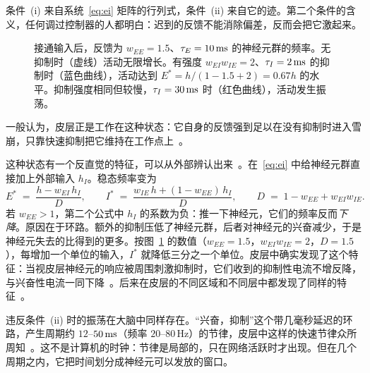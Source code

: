 条件~(i) 来自系统~\eqref{eq:ei} 矩阵的行列式，条件~(ii) 来自它的迹。第二个条件的含义，任何调过控制器的人都明白：迟到的反馈不能消除偏差，反而会把它激起来。

\begin{figure}[t]
\centering
{}
\caption{接通输入后，反馈为 $w_{EE}=1.5$、$\tau_E=10\,\text{ms}$ 的神经元群的频率。无抑制时（虚线）活动无限增长。有强度 $w_{EI}w_{IE}=2$、$\tau_I=2\,\text{ms}$ 的抑制时（蓝色曲线），活动达到 $E^*=h/(1-1.5+2)=0.67h$ 的水平。抑制强度相同但较慢，$\tau_I=30\,\text{ms}$ 时（红色曲线），活动发生振荡。}
\label{fig:ei}
\end{figure}

一般认为，皮层正是工作在这种状态：它自身的反馈强到足以在没有抑制时进入雪崩，只靠快速抑制把它维持在工作点上~\cite{Tsodyks1997isn}。

这种状态有一个反直觉的特征，可以从外部辨认出来~\cite{Tsodyks1997isn}。在~\eqref{eq:ei} 中给神经元群直接加上外部输入 $h_I$。稳态频率变为
\begin{equation}
E^* \;=\; \frac{h-w_{EI}\,h_I}{D},\qquad
I^* \;=\; \frac{w_{IE}\,h+(1-w_{EE})\,h_I}{D},\qquad
D \;=\; 1-w_{EE}+w_{EI}w_{IE} .
\label{eq:isn}
\end{equation}
若 $w_{EE}>1$，第二个公式中 $h_I$ 的系数为负：推一下神经元，它们的频率反而\emph{下降}。原因在于环路。额外的抑制压低了神经元群，后者对神经元的兴奋减少，于是神经元失去的比得到的更多。按图~\ref{fig:ei} 的数值（$w_{EE}=1.5$，$w_{EI}w_{IE}=2$，$D=1.5$），每增加一个单位的输入，$I^*$ 就降低三分之一个单位。皮层中确实发现了这个特征：当视皮层神经元的响应被周围刺激抑制时，它们收到的抑制性电流不增反降，与兴奋性电流一同下降~\cite{Ozeki2009}。后来在皮层的不同区域和不同层中都发现了同样的特征~\cite{Sanzeni2020}。

违反条件~(ii) 时的振荡在大脑中同样存在。“兴奋，抑制”这个带几毫秒延迟的环路，产生周期约 $12$--$50\,\text{ms}$（频率 $20$--$80$\,Hz）的节律，皮层中这样的快速节律众所周知~\cite{Cardin2009,Buzsaki2012}。这不是计算机的时钟：节律是局部的，只在网络活跃时才出现。但在几个周期之内，它把时间划分成神经元可以发放的窗口。

